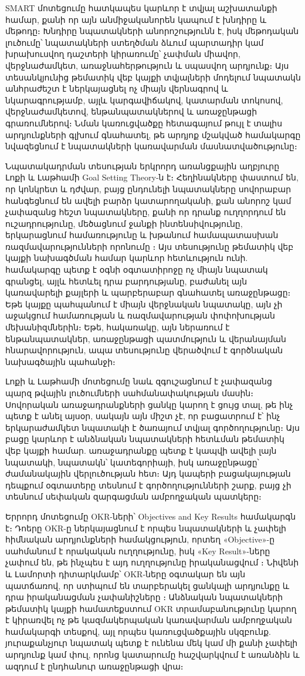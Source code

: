 SMART մոտեցումը հատկապես կարևոր է տվյալ աշխատանքի համար, քանի որ այն անմիջականորեն կապում է խնդիրը և մեթոդը։ Խնդիրը նպատակների անորոշությունն է, իսկ մեթոդական լուծումը՝ նպատակների ստեղծման ձևում պարտադիր կամ խրախուսվող դաշտերի կիրառումը՝ չափման միավոր, վերջնաժամկետ, առաջնահերթություն և սպասվող արդյունք։ Այս տեսանկյունից թեմատիկ վեբ կայքի տվյալների մոդելում նպատակն անհրաժեշտ է ներկայացնել ոչ միայն վերնագրով և նկարագրությամբ, այլև կարգավիճակով, կատարման տոկոսով, վերջնաժամկետով, ենթանպատակներով և առաջընթացի գրառումներով։ Նման կառուցվածքը հետագայում թույլ է տալիս արդյունքների գլխում գնահատել, թե արդյոք մշակված համակարգը նվազեցնում է նպատակների կառավարման մասնատվածությունը։

Նպատակադրման տեսության երկրորդ առանցքային աղբյուրը Լոքի և Լաթհամի Goal Setting Theory-ն է։ Հեղինակները փաստում են, որ կոնկրետ և դժվար, բայց ընդունելի նպատակները սովորաբար հանգեցնում են ավելի բարձր կատարողականի, քան անորոշ կամ չափազանց հեշտ նպատակները, քանի որ դրանք ուղղորդում են ուշադրությունը, մեծացնում ջանքի ինտենսիվությունը, երկարացնում համառությունը և խթանում համապատասխան ռազմավարությունների որոնումը \autocite{locke2002building}։ Այս տեսությունը թեմատիկ վեբ կայքի նախագծման համար կարևոր հետևություն ունի. համակարգը պետք է օգնի օգտատիրոջը ոչ միայն նպատակ գրանցել, այլև հետևել դրա բարդությանը, բաժանել այն կառավարելի քայլերի և պարբերաբար գնահատել առաջընթացը։ Եթե կայքը պահպանում է միայն վերջնական նպատակը, այն չի աջակցում համառության և ռազմավարության փոփոխության մեխանիզմներին։ Եթե, հակառակը, այն ներառում է ենթանպատակներ, առաջընթացի պատմություն և վերանայման հնարավորություն, ապա տեսությունը վերածվում է գործնական նախագծային պահանջի։

Լոքի և Լաթհամի մոտեցումը նաև զգուշացնում է չափազանց պարզ թվային լուծումների սահմանափակության մասին։ Սովորական առաջադրանքների ցանկը կարող է ցույց տալ, թե ինչ պետք է անել այսօր, սակայն այն միշտ չէ, որ բացատրում է՝ ինչ երկարաժամկետ նպատակի է ծառայում տվյալ գործողությունը։ Այս բացը կարևոր է անձնական նպատակների հետևման թեմատիկ վեբ կայքի համար. առաջադրանքը պետք է կապվի ավելի լայն նպատակի, նպատակն՝ կատեգորիայի, իսկ առաջընթացը՝ ժամանակային վերլուծության հետ։ Այդ կապերի բացակայության դեպքում օգտատերը տեսնում է գործողությունների շարք, բայց չի տեսնում սեփական զարգացման ամբողջական պատկերը։

Երրորդ մոտեցումը OKR-ների՝ Objectives and Key Results համակարգն է։ Դոերը OKR-ը ներկայացնում է որպես նպատակների և չափելի հիմնական արդյունքների համակցություն, որտեղ «Objective»-ը սահմանում է որակական ուղղությունը, իսկ «Key Result»-ները չափում են, թե ինչպես է այդ ուղղությունը իրականացվում \autocite{doerr2018measure}։ Նիվենի և Լամորտի դիտարկմամբ՝ OKR-ները օգտակար են այն պատճառով, որ ստիպում են տարբերակել ցանկալի արդյունքը և դրա իրականացման չափանիշները \autocite{niven2016objectives}։ Անձնական նպատակների թեմատիկ կայքի համատեքստում OKR տրամաբանությունը կարող է կիրառվել ոչ թե կազմակերպական կառավարման ամբողջական համակարգի տեսքով, այլ որպես կառուցվածքային սկզբունք. յուրաքանչյուր նպատակ պետք է ունենա մեկ կամ մի քանի չափելի արդյունք կամ փուլ, որոնց կատարումը հաշվարկվում է առանձին և ազդում է ընդհանուր առաջընթացի վրա։

